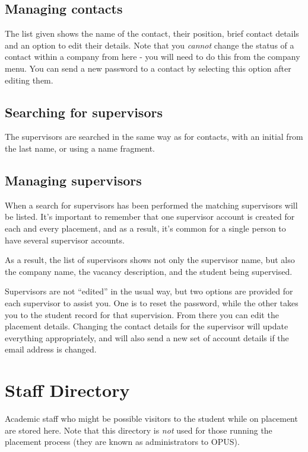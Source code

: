 \documentclass[12 pt]{book}
\begin{document}
\section{Managing contacts}

The list given shows the name of the contact, their position, brief contact details and an option to
edit their details. Note that you \emph{cannot} change the status of a contact within a company
from here - you will need to do this from the company menu. You can send a new password to a contact
by selecting this option after editing them.

\section{Searching for supervisors}

The supervisors are searched in the same way as for contacts, with an initial from the last name,
or using a name fragment.

\section{Managing supervisors}

When a search for supervisors has been performed the matching supervisors will
be listed. It's important to remember that one supervisor account is created
for each and every placement, and as a result, it's common for a single
person to have several supervisor accounts.

As a result, the list of supervisors shows not only the supervisor name, but
also the company name, the vacancy description, and the student being
supervised.

Supervisors are not ``edited'' in the usual way, but two options are provided
for each supervisor to assist you. One is to reset the password, while the
other takes you to the student record for that supervision. From there you can
edit the placement details. Changing the contact details for the supervisor
will update everything appropriately, and will also send a new set of account
details if the email address is changed.

%
%
%

\chapter{Staff Directory}

Academic staff who might be possible visitors to the student while on placement
are stored here. Note that this directory is \emph{not} used for those running
the placement process (they are known as administrators to OPUS).
\end{document}
